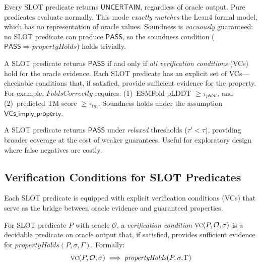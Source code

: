 \documentclass[sigplan,10pt,manuscript,review,anonymous]{acmart}
\newcommand{\PASS}{\ensuremath{\mathsf{PASS}}\xspace}
\newcommand{\UNCERTAIN}{\ensuremath{\mathsf{UNCERTAIN}}\xspace}
\newcommand{\seq}{\sigma}
\newcommand{\pred}{P}
\newcommand{\VC}{\textsc{vc}\xspace}
\newcommand{\CONSERVATIVE}{\textsc{Conservative}\xspace}
\newcommand{\VERIFIED}{\textsc{Verified}\xspace}
\newcommand{\PERMISSIVE}{\textsc{Permissive}\xspace}
\begin{document}
\begin{description}[leftmargin=!,labelwidth=2.2cm,itemsep=3pt,topsep=2pt]
\item[\CONSERVATIVE:]
Every SLOT predicate returns \UNCERTAIN, regardless of oracle output.
Pure predicates evaluate normally.
This mode \emph{exactly matches} the Lean4 formal model, which has no
representation of oracle values.
Soundness is \emph{vacuously} guaranteed: no SLOT predicate can produce
\PASS, so the soundness condition
($\PASS \Rightarrow \mathit{propertyHolds}$) holds trivially.

\item[\VERIFIED:]
A SLOT predicate returns \PASS{} if and only if \emph{all verification
conditions} (VCs) hold for the oracle evidence.
Each SLOT predicate has an explicit set of VCs---checkable conditions
that, if satisfied, provide sufficient evidence for the property.
For example, $\mathit{FoldsCorrectly}$ requires:
(1)~ESMFold pLDDT $\ge \tau_{\mathit{plddt}}$, and
(2)~predicted TM-score $\ge \tau_{\mathit{tm}}$.
Soundness holds under the assumption
$\textsf{VCs\_imply\_property}$.

\item[\PERMISSIVE:]
A SLOT predicate returns \PASS{} under \emph{relaxed} thresholds
($\tau' < \tau$), providing broader coverage at the cost of weaker
guarantees.
Useful for exploratory design where false negatives are costly.
\end{description}

\subsection{Verification Conditions for SLOT Predicates}\label{sec:vcs}

Each SLOT predicate is equipped with explicit verification conditions
(VCs) that serve as the bridge between oracle evidence and guaranteed
properties.

\begin{definition}
For SLOT predicate $\pred$ with oracle $\mathcal{O}$, a
\emph{verification condition} $\VC(\pred, \mathcal{O}, \seq)$ is a
decidable predicate on oracle output that, if satisfied, provides
sufficient evidence for $\mathit{propertyHolds}(\pred, \seq, \Gamma)$.
Formally:
\[
  \VC(\pred, \mathcal{O}, \seq) \;\Longrightarrow\;
  \mathit{propertyHolds}(\pred, \seq, \Gamma)
\]
\end{definition}
\end{document}
